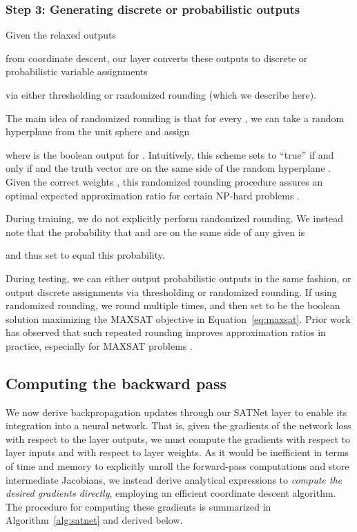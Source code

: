 \documentclass{article}
\begin{document}
	\subsubsection{Step 3: Generating discrete or probabilistic outputs}
	\label{sec:rr}
	
	Given the relaxed outputs 

	from coordinate descent, our layer converts these outputs to discrete or probabilistic variable assignments 

	via either thresholding or randomized rounding (which we describe here). 
	
	The main idea of randomized rounding is that for every , we can take a random hyperplane  from the unit sphere and assign
	
	where  is the boolean output for . 
	Intuitively, this scheme sets  to ``true'' if and only if  and the truth vector  are on the same side of the random hyperplane .
	Given the correct weights , this randomized rounding procedure assures an optimal expected approximation ratio for certain NP-hard problems \cite{goemans1995improved}. 
	
	During training, we do not explicitly perform randomized rounding.
	We instead note that the probability that  and  are on the same side of any given  is
	
	and thus set  to equal this probability. 
	
	During testing, we can either output probabilistic outputs in the same fashion, or output discrete assignments via thresholding or randomized rounding.
	If using randomized rounding, we round multiple times, and then
	set  to be the 
boolean solution maximizing the MAXSAT objective in Equation~\eqref{eq:maxsat}. 
	Prior work has observed that such repeated rounding improves approximation ratios in practice, especially for MAXSAT problems \cite{wang2018low}.


	\subsection{Computing the backward pass}
	\label{sec:backward}
	
	We now derive backpropagation updates through our SATNet layer to enable its integration into a neural network.
	That is, given the gradients  of the network loss  with respect to the layer outputs, we must compute the gradients  with respect to layer inputs and  with respect to layer weights.
As it would be inefficient in terms of time and memory to explicitly unroll the forward-pass computations and store intermediate Jacobians,
	we instead derive analytical expressions to \emph{compute the desired gradients directly}, employing an efficient coordinate descent algorithm.
	The procedure for computing these gradients is summarized in Algorithm~\ref{alg:satnet} and derived below.
	
\end{document}
